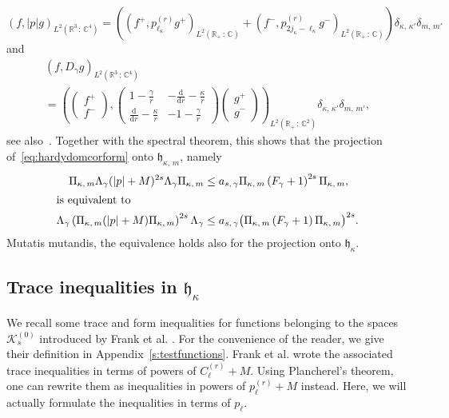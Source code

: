\documentclass[AHL,Unicode,longabstracts,published]{cedram}
\newcommand*\rd{\mathrm{d}}
\newcommand*\dr{\mathrm{d}r}
\newcommand*\cz{\mathbb{C}}
\newcommand*\rz{\mathbb{R}}
\newcommand*\cK{\mathcal{K}}
\newcommand*\gh{\mathfrak{h}}
\begin{document}
\[
\left(f,|p| g\right)_{L^2\left(\rz^3\,:\,\cz^4\right)} = \left(\left(f^+,p_{\ell_\kappa}^{(r)} g^+\right)_{L^2\left(\rz_+\,:\,\cz\right)} + \left(f^-,p_{2j_\kappa-\ell_\kappa}^{(r)} g^-\right)_{L^2\left(\rz_+\,:\,\cz\right)}\right)\delta_{\kappa,\,\kappa'}\delta_{m,\,m'}
\]
and
\begin{multline}\label{eq:radialdirac}
(f,D_\gamma g)_{L^2\left(\rz^3\,:\,\cz^4\right)}\\
= \left(\left(
\begin{matrix}
f^+\\ f^-
\end{matrix}
\right),\left(
\begin{matrix}
1-\frac{\gamma}{r} & -\frac{\rd}{\dr}-\frac{\kappa}{r}\\
\frac{\rd}{\dr}-\frac{\kappa}{r} & -1-\frac{\gamma}{r}
\end{matrix}
\right)\left(
\begin{matrix}
g^+\\ g^-
\end{matrix}
\right)\right)_{L^2\left(\rz_+\,:\,\cz^2\right)}\delta_{\kappa,\,\kappa'}\delta_{m,\,m'},
\end{multline}
see also~\cite[Formula~(7.105)]{Thaller1992}. Together with the spectral theorem, this shows that the projection of~\eqref{eq:hardydomcorform} onto $\gh_{\kappa,\,m}$, namely
\begin{align}
\Pi_{\kappa,\,m}\Lambda_\gamma(|p|+M)^{2s}\Lambda_\gamma\Pi_{\kappa,\,m}
&\leq a_{s,\,\gamma} \Pi_{\kappa,\,m}\left(F_\gamma+1\right)^{2s}\Pi_{\kappa,\,m},\label{eq:hardydomcorang0}\\
\intertext{is equivalent to}
\Lambda_\gamma\left(\Pi_{\kappa,\,m}(|p|+M)\Pi_{\kappa,\,m}\right)^{2s}\Lambda_\gamma
&\leq a_{s,\,\gamma}\big(\Pi_{\kappa,\,m}\left(F_{\gamma}+1\right)\Pi_{\kappa,\,m}\big)^{2s}.
\label{eq:hardydomcorang}
\end{align}
Mutatis mutandis, the equivalence holds also for the projection onto $\gh_\kappa$.

\subsection{Trace inequalities in \texorpdfstring{$\gh_\kappa$}{gh kappa}}\label{ss:traceinequalities}

We recall some trace and form inequalities for functions belonging to the spaces $\cK_{s}^{(0)}$ introduced by Frank et al. \cite{Franketal2020P}. For the convenience of the reader, we give their definition in Appendix~\ref{s:testfunctions}. Frank et al. \cite{Franketal2020P} wrote the associated trace inequalities in terms of powers of $C_\ell^{(r)}+M$. Using Plancherel's theorem, one can rewrite them as inequalities in powers of $p_\ell^{(r)}+M$ instead. Here, we will actually formulate the inequalities in terms of $p_\ell$.
\end{document}
